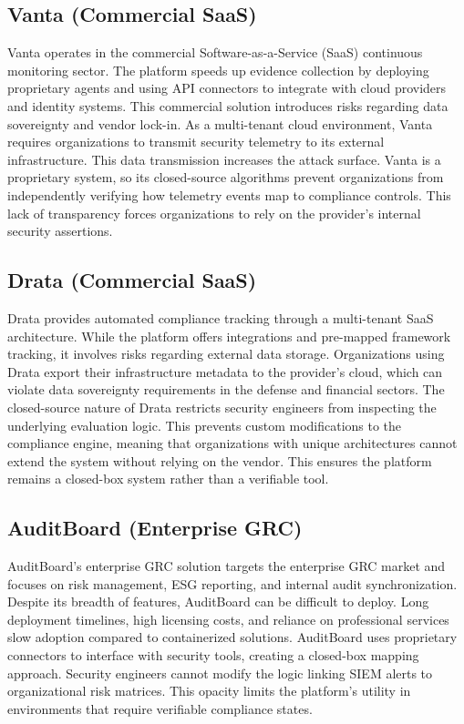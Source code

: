 \subsection{Vanta (Commercial SaaS)}
Vanta operates in the commercial Software-as-a-Service (SaaS) continuous monitoring sector. The platform speeds up evidence collection by deploying proprietary agents and using API connectors to integrate with cloud providers and identity systems. This commercial solution introduces risks regarding data sovereignty and vendor lock-in. As a multi-tenant cloud environment, Vanta requires organizations to transmit security telemetry to its external infrastructure. This data transmission increases the attack surface. Vanta is a proprietary system, so its closed-source algorithms prevent organizations from independently verifying how telemetry events map to compliance controls. This lack of transparency forces organizations to rely on the provider's internal security assertions.

\subsection{Drata (Commercial SaaS)}
Drata provides automated compliance tracking through a multi-tenant SaaS architecture. While the platform offers integrations and pre-mapped framework tracking, it involves risks regarding external data storage. Organizations using Drata export their infrastructure metadata to the provider's cloud, which can violate data sovereignty requirements in the defense and financial sectors. The closed-source nature of Drata restricts security engineers from inspecting the underlying evaluation logic. This prevents custom modifications to the compliance engine, meaning that organizations with unique architectures cannot extend the system without relying on the vendor. This ensures the platform remains a closed-box system rather than a verifiable tool.

\subsection{AuditBoard (Enterprise GRC)}
AuditBoard's enterprise GRC solution targets the enterprise GRC market and focuses on risk management, ESG reporting, and internal audit synchronization. Despite its breadth of features, AuditBoard can be difficult to deploy. Long deployment timelines, high licensing costs, and reliance on professional services slow adoption compared to containerized solutions. AuditBoard uses proprietary connectors to interface with security tools, creating a closed-box mapping approach. Security engineers cannot modify the logic linking SIEM alerts to organizational risk matrices. This opacity limits the platform's utility in environments that require verifiable compliance states.

